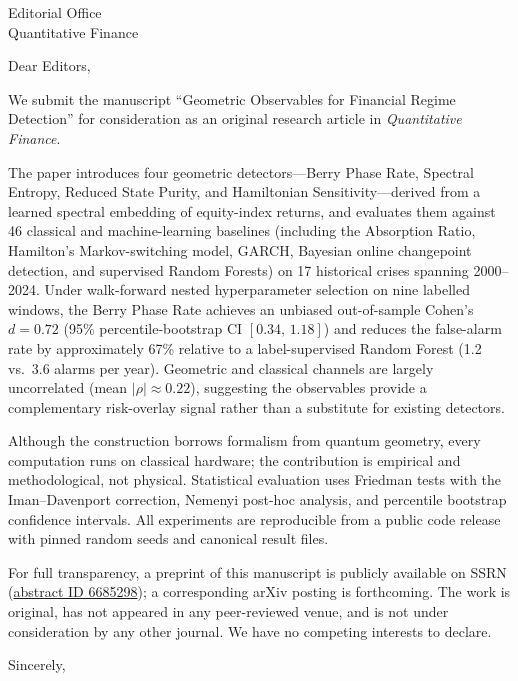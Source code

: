 \documentclass[11pt]{letter}
\begin{document}
\begin{letter}{Editorial Office\\Quantitative Finance}

\opening{Dear Editors,}

We submit the manuscript ``Geometric Observables for Financial Regime
Detection'' for consideration as an original research article in
\emph{Quantitative Finance}.

The paper introduces four geometric detectors---Berry Phase Rate,
Spectral Entropy, Reduced State Purity, and Hamiltonian
Sensitivity---derived from a learned spectral embedding of equity-index
returns, and evaluates them against 46 classical and machine-learning
baselines (including the Absorption Ratio, Hamilton's Markov-switching
model, GARCH, Bayesian online changepoint detection, and supervised
Random Forests) on 17 historical crises spanning 2000--2024.  Under
walk-forward nested hyperparameter selection on nine labelled windows,
the Berry Phase Rate achieves an unbiased out-of-sample Cohen's
$d = 0.72$ (95\% percentile-bootstrap CI $[0.34,\,1.18]$) and reduces
the false-alarm rate by approximately 67\% relative to a label-supervised
Random Forest (1.2 vs.\ 3.6 alarms per year).  Geometric and classical
channels are largely uncorrelated (mean $|\rho| \approx 0.22$), suggesting the
observables provide a complementary risk-overlay signal rather than a
substitute for existing detectors.

Although the construction borrows formalism from quantum geometry, every
computation runs on classical hardware; the contribution is empirical
and methodological, not physical.  Statistical evaluation uses
Friedman tests with the Iman--Davenport correction, Nemenyi post-hoc
analysis, and percentile bootstrap confidence intervals.  All
experiments are reproducible from a public code release with pinned
random seeds and canonical result files.

For full transparency, a preprint of this manuscript is publicly
available on SSRN (\href{https://ssrn.com/abstract=6685298}{abstract
ID 6685298}); a corresponding arXiv posting is forthcoming.  The work
is original, has not appeared in any peer-reviewed venue, and is not
under consideration by any other journal.  We have no competing
interests to declare.

\closing{Sincerely,}

\end{letter}
\end{document}
